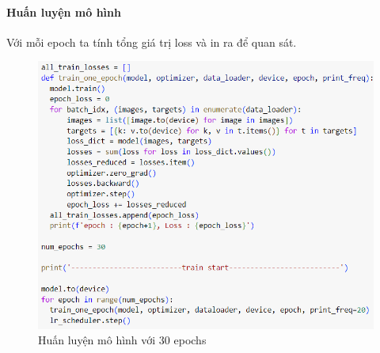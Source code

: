 \paragraph{Huấn luyện mô hình\\}
Với mỗi epoch ta tính tổng giá trị loss và in ra để quan sát.
\begin{figure}[h!]
  \centering
  \includegraphics[scale=0.7]{graphics/train.png}
  \caption{Huấn luyện mô hình với 30 epochs}
\end{figure}
